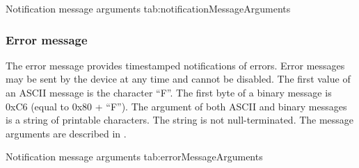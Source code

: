 \begingroup
    \def\tempArgumentA{Notification string}
    \dataMessageTable
    {Notification message arguments}
    {tab:notificationMessageArguments}
\endgroup

\begingroup
    \def\tempNameA{String}
    \def\tempValueA{This is a notification message.}
    \def\tempAsciiFirst{N}
    \def\tempAsciiA{This is a notification message.}
    \def\tempBinaryFirst{CE}
    \def\tempBinaryA{54 68 69 73 20 69 73 20 61 20 6E 6F 74 69 66 69 63 61 74 69 6F 6E 20 6D 65 73 73 61 67 65 2E}
    \dataMessageExample
\endgroup

\subsubsection{Error message}

The error message provides timestamped notifications of errors.  Error messages may be sent by the device at any time and cannot be disabled.  The first value of an \ac{ASCII} message is the character \enquote{F}.  The first byte of a binary message is 0xC6 (equal to 0x80 + \enquote{F}).  The argument of both \ac{ASCII} and binary messages is a string of printable characters.  The string is not null-terminated.  The message arguments are described in .

\begingroup
    \def\tempArgumentA{Error string}
    \dataMessageTable
    {Notification message arguments}
    {tab:errorMessageArguments}
\endgroup

\begingroup
    \def\tempNameA{String}
    \def\tempValueA{This is an error message.}
    \def\tempAsciiFirst{F}
    \def\tempAsciiA{This is an error message.}
    \def\tempBinaryFirst{C6}
    \def\tempBinaryA{54 68 69 73 20 69 73 20 61 6E 20 65 72 72 6F 72 20 6D 65 73 73 61 67 65 2E}
    \dataMessageExample
\endgroup
